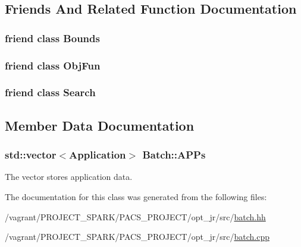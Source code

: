 \subsection{Friends And Related Function Documentation}
\hypertarget{classBatch_ac174a08cdaebb01dfd90673034f10fab}{
\subsubsection[{Bounds}]{\setlength{\rightskip}{0pt plus 5cm}friend class {\bf Bounds}\hspace{0.3cm}{\ttfamily [friend]}}}\label{classBatch_ac174a08cdaebb01dfd90673034f10fab}
\hypertarget{classBatch_ab332b708060d79472caf1a215fe8b6a9}{
\subsubsection[{Obj\-Fun}]{\setlength{\rightskip}{0pt plus 5cm}friend class {\bf Obj\-Fun}\hspace{0.3cm}{\ttfamily [friend]}}}\label{classBatch_ab332b708060d79472caf1a215fe8b6a9}
\hypertarget{classBatch_aea88561fddd2e924cebf793f0cfdc8b6}{
\subsubsection[{Search}]{\setlength{\rightskip}{0pt plus 5cm}friend class {\bf Search}\hspace{0.3cm}{\ttfamily [friend]}}}\label{classBatch_aea88561fddd2e924cebf793f0cfdc8b6}


\subsection{Member Data Documentation}
\hypertarget{classBatch_a757bf1a36fee46b1b47263ab4a59c560}{
\subsubsection[{A\-P\-Ps}]{\setlength{\rightskip}{0pt plus 5cm}std\-::vector$<${\bf Application}$>$ Batch\-::\-A\-P\-Ps\hspace{0.3cm}{\ttfamily [private]}}}\label{classBatch_a757bf1a36fee46b1b47263ab4a59c560}


The vector stores application data. 



The documentation for this class was generated from the following files\-:\begin{DoxyCompactItemize}
\item 
/vagrant/\-P\-R\-O\-J\-E\-C\-T\-\_\-\-S\-P\-A\-R\-K/\-P\-A\-C\-S\-\_\-\-P\-R\-O\-J\-E\-C\-T/opt\-\_\-jr/src/\hyperlink{batch_8hh}{batch.\-hh}\item 
/vagrant/\-P\-R\-O\-J\-E\-C\-T\-\_\-\-S\-P\-A\-R\-K/\-P\-A\-C\-S\-\_\-\-P\-R\-O\-J\-E\-C\-T/opt\-\_\-jr/src/\hyperlink{batch_8cpp}{batch.\-cpp}\end{DoxyCompactItemize}
